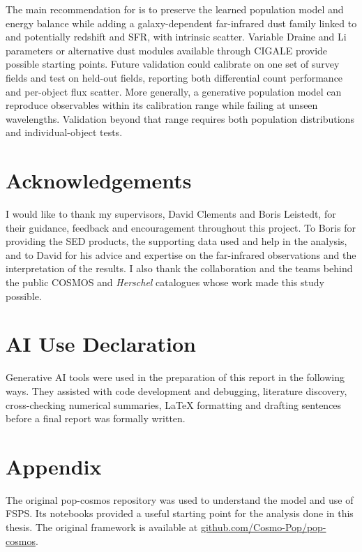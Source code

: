 \documentclass[12pt,a4paper]{article}
\begin{document}
The main recommendation for \popcosmos{} is to preserve the learned population model and
energy balance while adding a galaxy-dependent far-infrared dust
family linked to \LIR{} and potentially redshift and SFR, with intrinsic scatter.
Variable Draine and Li parameters \citep{Draine_2007} or alternative dust modules
available through CIGALE \citep{Boquien_2019} provide possible starting points. Future validation could calibrate
on one set of survey fields and test on held-out fields, reporting both differential
count performance and per-object flux scatter. More generally, a generative population
model can reproduce observables within its calibration range while failing at unseen
wavelengths. Validation beyond that range requires both population distributions and
individual-object tests.

\section*{Acknowledgements}
I would like to thank my supervisors, David Clements and Boris Leistedt, for their
guidance, feedback and encouragement throughout this project. To Boris for providing the \popcosmos{} SED products, the supporting data used and help in the analysis, and to David for his advice and expertise on the far-infrared observations and the interpretation of the results. I also thank the \popcosmos{} collaboration and the
teams behind the public COSMOS and \emph{Herschel} catalogues whose work made this
study possible.

\FloatBarrier
\section*{AI Use Declaration}
Generative AI tools were used in the preparation of this report in the following
ways. They assisted with code development and debugging, literature discovery,
cross-checking numerical summaries, LaTeX formatting and drafting sentences before a final report was formally written.

\appendix
\section*{Appendix}

The original pop-cosmos repository was used to understand the model and use of FSPS. Its notebooks provided a useful starting point for the analysis done in this thesis. The
original framework is available at
\href{https://github.com/Cosmo-Pop/pop-cosmos}
{github.com/Cosmo-Pop/pop-cosmos}.
\end{document}
